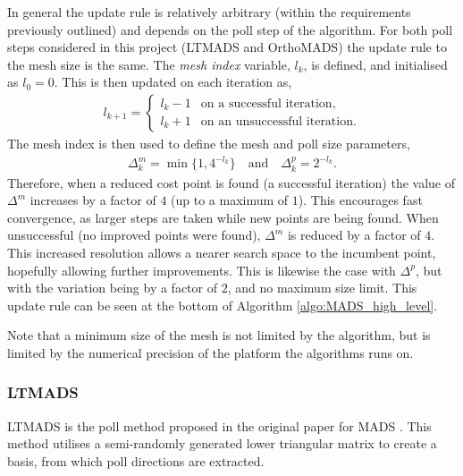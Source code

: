 In general the update rule is relatively arbitrary (within the requirements previously outlined) and depends on the poll step of the algorithm. For both poll steps considered in this project (\ac{LTMADS} and \ac{OrthoMADS}) the update rule to the mesh size is the same. The \textit{mesh index} variable, $l_k$, is defined, and initialised as $l_0=0$. This is then updated on each iteration as, 
\begin{gather}\label{eqn:mads_eb_mesh_index_update}   
    l_{k+1} = 
        \begin{cases}
        l_k-1 & \text{on a successful iteration},\\
        l_k+1 & \text{on an unsuccessful iteration}.
        \end{cases}
\end{gather}
The mesh index is then used to define the mesh and poll size parameters, 
\begin{gather}
    \Delta_k^m = \min\{{1, 4^{-l_k}}\} \quad \text{and} \quad \Delta^p_k = 2^{-l_k}.\label{eqn:mads_eb_mesh_update}
\end{gather}
Therefore, when a reduced cost point is found (a successful iteration) the value of $\Delta^m$ increases by a factor of $4$ (up to a maximum of $1$). This encourages fast convergence, as larger steps are taken while new points are being found. When unsuccessful (no improved points were found), $\Delta^m$ is reduced by a factor of $4$. This increased resolution allows a nearer search space to the incumbent point, hopefully allowing further improvements. This is likewise the case with $\Delta^p$, but with the variation being by a factor of $2$, and no maximum size limit. This update rule can be seen at the bottom of Algorithm \ref{algo:MADS_high_level}.

Note that a minimum size of the mesh is not limited by the algorithm, but is limited by the numerical precision of the platform the algorithms runs on. 


\subsubsection{LTMADS}\label{subsub:ltmads_algo}
\ac{LTMADS} is the poll method proposed in the original paper for \ac{MADS} \cite{Audet2007MeshOptimization}. This method utilises a semi-randomly generated lower triangular matrix to create a basis, from which poll directions are extracted. 

